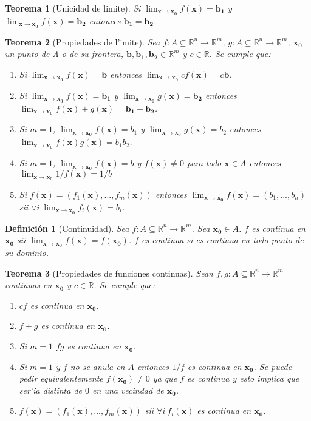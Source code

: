\documentclass[a4paper,spanish]{article}
\newcommand{\R}[0]{\mathbb{R}}
\newcommand{\limite}[2]{\lim_{ #1 \rightarrow #2}}
\newcommand{\xx}[0]{\mathbf{x}}
\newcommand{\xO}[0]{\mathbf{x_0}}
\newtheorem{teo}{Teorema}
\newtheorem{defi}{Definici\'on}
\begin{document}
\begin{teo}[Unicidad de limite]
\label{teo-unico-limite}
Si $\limite{\xx}{\xO} f(\xx) = \mathbf{b_1}$ y 
$\limite{\xx}{\xO} f(\xx) = \mathbf{b_2}$ entonces 
$\mathbf{b_1} = \mathbf{b_2}$.
\end{teo}

\begin{teo}[Propiedades de l'imite]
\label{teo-propiedades-limite}
Sea $f : A \subseteq \R^n \to \R^m$, $g : A \subseteq \R^n \to \R^m$, $\xO$
un punto de A o de su frontera, $\mathbf{b}, \mathbf{b_1}, \mathbf{b_2} \in 
\R^m$ y $c \in \R$. Se cumple que:
\begin{enumerate}[i]
\item Si $\limite{\xx}{\xO} f(\xx) = \mathbf{b}$ entonces 
$\limite{\xx}{\xO} cf(\xx) = c\mathbf{b}$.
\item Si $\limite{\xx}{\xO} f(\xx) = \mathbf{b_1}$ y 
$\limite{\xx}{\xO} g(\xx) = \mathbf{b_2}$ entonces
$\limite{\xx}{\xO} f(\xx)+g(\xx) = \mathbf{b_1} + \mathbf{b_2}$.
\item Si $m = 1$, $\limite{\xx}{\xO} f(\xx) = b_1$ y 
$\limite{\xx}{\xO} g(\xx) = b_2$ entonces
$\limite{\xx}{\xO} f(\xx)g(\xx) = b_1 b_2$.
\item Si $m = 1$, $\limite{\xx}{\xO} f(\xx)  = b$ y $f(\xx) \neq 0$
para todo $\xx \in A$ entonces $\limite{\xx}{\xO} 1/f(\xx) = 1/b$
\item Si $f(\xx) = (f_1(\xx),...,f_m(\xx))$ entonces 
$\limite{\xx}{\xO} f(\xx) = (b_1,...,b_n)$ sii 
$\forall i\ \limite{\xx}{\xO} f_i(\xx) = b_i$.
\end{enumerate}
\end{teo}

\begin{defi}[Continuidad]
\label{def-continua}
Sea $f : A \subseteq \R^n \to \R^m$. Sea $\xO \in A$. $f$ es \emph{continua}
en $\xO$ sii $\limite{\xx}{\xO} f(\xx) = f(\xO)$. $f$ es \emph{continua} si 
es continua en todo punto de su dominio.
\end{defi}

\begin{teo}[Propiedades de funciones continuas]
\label{teo-propiedades-continua}
Sean $f,g : A \subseteq \R^n \to \R^m$ continuas en $\xO$ y 
$c \in \R$. Se cumple que:
\begin{enumerate}[i]
\item $cf$ es continua en $\xO$.
\item $f + g$ es continua en $\xO$.
\item Si $m = 1$ $fg$ es continua en $\xO$.
\item Si $m = 1$ y $f$ no se anula en $A$ entonces $1/f$ es continua en $\xO$. 
Se puede pedir equivalentemente $f(\xO) \neq 0$ ya que $f$ es continua y esto
implica que ser'ia distinta de $0$ en una vecindad de $\xO$.
\item $f(\xx) = (f_1(\xx),...,f_m(\xx))$ sii
$\forall i\ {f_i(\xx)}$ es continua en $\xO$.
\end{enumerate}
\end{teo}
\end{document}
